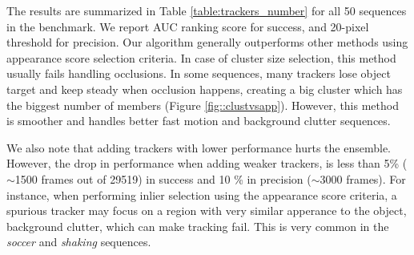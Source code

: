 \begin{table}[h!]
\centering
\caption{\small Average AUC and precision for inliers selection methods.}
\label{table:trackers_number}
\end{table}

The results are summarized in Table \ref{table:trackers_number} for all 50
sequences in the benchmark.
We report AUC ranking score for success, 
and 20-pixel threshold for precision.
%
%
Our algorithm generally outperforms other methods using
appearance score selection criteria. In case of cluster size selection,
this method usually fails handling occlusions. In some sequences, many trackers
lose object target and keep steady when occlusion happens, creating a big
cluster which has the biggest number of members (Figure \ref{fig::clustvsapp}).
However, this method is smoother and handles better fast motion and background
clutter sequences.



We also note that adding trackers with lower performance hurts the ensemble.
However, the drop in performance when adding
weaker trackers, is less than 5\% ($\sim$1500 frames out of 29519) in success and 10
\% in
precision ($\sim$3000 frames). For instance, when performing inlier selection using
the
appearance score criteria, a spurious tracker may focus on a region with
very similar apperance to the object, \eg background clutter, which can
make tracking fail.
This is very common in the \textit{soccer} and \textit{shaking}
sequences.

